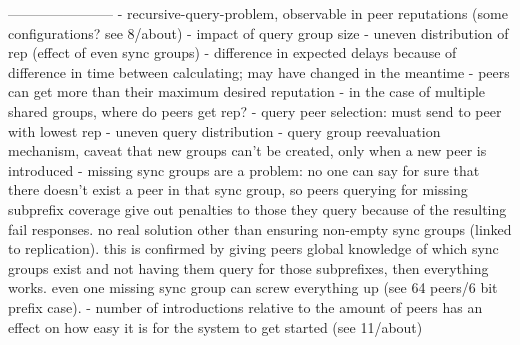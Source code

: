 -----------------------
- recursive-query-problem, observable in peer reputations (some configurations?
  see 8/about)
- impact of query group size
- uneven distribution of rep (effect of even sync groups)
- difference in expected delays because of difference in time between
  calculating; may have changed in the meantime
- peers can get more than their maximum desired reputation
- in the case of multiple shared groups, where do peers get rep?
- query peer selection: must send to peer with lowest rep
- uneven query distribution
- query group reevaluation mechanism, caveat that new groups can't be created,
  only when a new peer is introduced
- missing sync groups are a problem: no one can say for sure that there doesn't
  exist a peer in that sync group, so peers querying for missing subprefix
  coverage give out penalties to those they query because of the resulting fail
  responses. no real solution other than ensuring non-empty sync groups (linked
  to replication). this is confirmed by giving peers global knowledge of which
  sync groups exist and not having them query for those subprefixes, then
  everything works. even one missing sync group can screw everything up (see 64
  peers/6 bit prefix case).
- number of introductions relative to the amount of peers has an effect on how
  easy it is for the system to get started (see 11/about)

